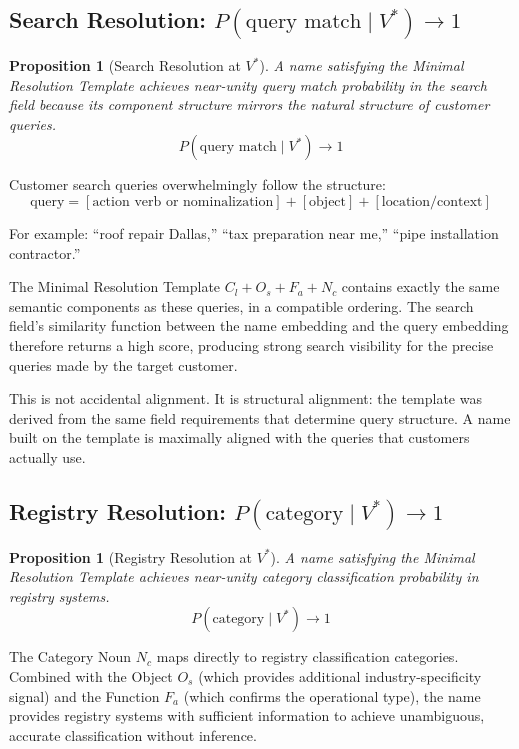\documentclass[12pt, openany]{book}
\theoremstyle{thmstyle}
\newtheorem{proposition}[theorem]{Proposition}
\theoremstyle{defstyle}
\newcommand{\vstar}{V^{*}}
\newcommand{\Nc}{N_c}
\newcommand{\Os}{O_s}
\newcommand{\Fa}{F_a}
\newcommand{\Cl}{C_l}
\begin{document}
\subsection{Search Resolution: $P(\text{query match} \mid V^*) \to 1$}

\begin{proposition}[Search Resolution at $\vstar$]
A name satisfying the Minimal Resolution Template achieves near-unity query match probability in the search field because its component structure mirrors the natural structure of customer queries.
\[
P(\text{query match} \mid \vstar) \to 1
\]
\end{proposition}

Customer search queries overwhelmingly follow the structure:
\[
\text{query} = [\text{action verb or nominalization}] + [\text{object}] + [\text{location/context}]
\]

For example: ``roof repair Dallas,'' ``tax preparation near me,'' ``pipe installation contractor.''

The Minimal Resolution Template $\Cl + \Os + \Fa + \Nc$ contains exactly the same semantic components as these queries, in a compatible ordering. The search field's similarity function between the name embedding and the query embedding therefore returns a high score, producing strong search visibility for the precise queries made by the target customer.

This is not accidental alignment. It is structural alignment: the template was derived from the same field requirements that determine query structure. A name built on the template is maximally aligned with the queries that customers actually use.

\subsection{Registry Resolution: $P(\text{category} \mid V^*) \to 1$}

\begin{proposition}[Registry Resolution at $\vstar$]
A name satisfying the Minimal Resolution Template achieves near-unity category classification probability in registry systems.
\[
P(\text{category} \mid \vstar) \to 1
\]
\end{proposition}

The Category Noun $\Nc$ maps directly to registry classification categories. Combined with the Object $\Os$ (which provides additional industry-specificity signal) and the Function $\Fa$ (which confirms the operational type), the name provides registry systems with sufficient information to achieve unambiguous, accurate classification without inference.
\end{document}
